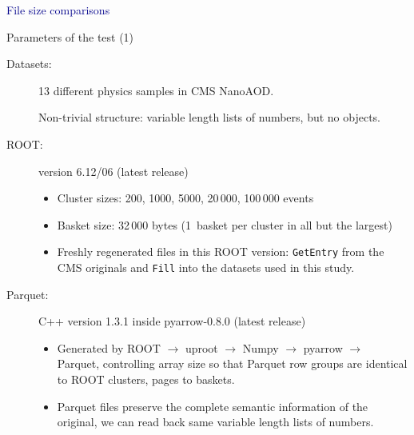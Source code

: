 \documentclass[aspectratio=169]{beamer}
\begin{document}
\begin{frame}{}
\vspace{0.5 cm}
\begin{center}
\Huge \textcolor{darkblue}{File size comparisons}
\end{center}
\end{frame}

\begin{frame}{Parameters of the test (1)}
\vspace{0.35 cm}
\begin{description}
\item[Datasets:] 13 different physics samples in CMS NanoAOD.

\vspace{0.1 cm}
Non-trivial structure: variable length lists of numbers, but no objects.

\vspace{0.2 cm}
\item[ROOT:] version 6.12/06 (latest release)

\begin{itemize}
\item Cluster sizes: 200, 1000, 5000, 20\,000, 100\,000 events
\item Basket size: 32\,000 bytes (1~basket per cluster in all but the largest)
\item Freshly regenerated files in this ROOT version: {\tt\small GetEntry} from the CMS originals and {\tt\small Fill} into the datasets used in this study.
\end{itemize}

\item[Parquet:] C++ version 1.3.1 inside pyarrow-0.8.0 (latest release)

\begin{itemize}
\item Generated by ROOT $\to$ uproot $\to$ Numpy $\to$ pyarrow $\to$ Parquet, controlling array size so that Parquet row groups are identical to ROOT clusters, pages to baskets.
\item Parquet files preserve the complete semantic information of the original, we can read back same variable length lists of numbers.
\end{itemize}
\end{description}
\end{frame}
\end{document}
